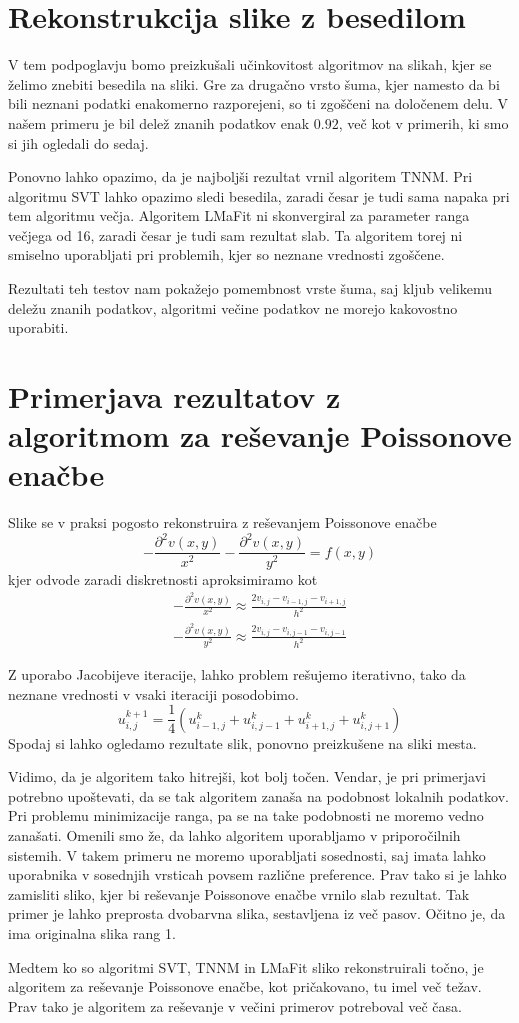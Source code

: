 \section{Rekonstrukcija slike z besedilom}
V tem podpoglavju bomo preizkušali učinkovitost algoritmov na slikah, kjer se želimo znebiti besedila na sliki. Gre za drugačno vrsto šuma, kjer namesto da bi bili neznani podatki enakomerno razporejeni, so ti zgoščeni na določenem delu. V našem primeru je bil delež znanih podatkov enak $0.92$, več kot v primerih, ki smo si jih ogledali do sedaj.


Ponovno lahko opazimo, da je najboljši rezultat vrnil algoritem TNNM. Pri algoritmu SVT lahko opazimo sledi besedila, zaradi česar je tudi sama napaka pri tem algoritmu večja. Algoritem LMaFit ni skonvergiral za parameter ranga večjega od 16, zaradi česar je tudi sam rezultat slab. Ta algoritem torej ni smiselno uporabljati pri problemih, kjer so neznane vrednosti zgoščene.

Rezultati teh testov nam pokažejo pomembnost vrste šuma, saj kljub velikemu deležu znanih podatkov, algoritmi večine podatkov ne morejo kakovostno uporabiti.

\section{Primerjava rezultatov z algoritmom za reševanje Poissonove enačbe}
Slike se v praksi pogosto rekonstruira z reševanjem Poissonove enačbe
\[
    -\frac{\partial^2v(x, y)}{x^2} - \frac{\partial^2v(x, y)}{y^2} = f(x,y)
\]
kjer odvode zaradi diskretnosti aproksimiramo kot 
\begin{align*}
    -\frac{\partial^2v(x, y)}{x^2} \approx \frac{2v_{i,j} - v_{i-1, j} - v_{i+1, j}}{h^2} \\
    -\frac{\partial^2v(x, y)}{y^2} \approx \frac{2v_{i,j} - v_{i, j-1} - v_{i, j-1}}{h^2}
\end{align*}

Z uporabo Jacobijeve iteracije, lahko problem rešujemo iterativno, tako da neznane vrednosti v vsaki iteraciji posodobimo.
\[
  u_{i, j}^{k+1} = \frac{1}{4}(u_{i - 1, j}^k +  u_{i, j - 1}^k + u_{i + 1, j}^k + u_{i, j + 1}^k)
\]
Spodaj si lahko ogledamo rezultate slik, ponovno preizkušene na sliki mesta.

\FloatBarrier

Vidimo, da je algoritem tako hitrejši, kot bolj točen. Vendar, je pri primerjavi potrebno upoštevati, da se tak algoritem zanaša na podobnost lokalnih podatkov. Pri problemu minimizacije ranga, pa se na take podobnosti ne moremo vedno zanašati. Omenili smo že, da lahko algoritem uporabljamo v priporočilnih sistemih. V takem primeru ne moremo uporabljati sosednosti, saj imata lahko uporabnika v sosednjih vrsticah povsem različne preference. Prav tako si je lahko zamisliti sliko, kjer bi reševanje Poissonove enačbe vrnilo slab rezultat. Tak primer je lahko preprosta dvobarvna slika, sestavljena iz več pasov. Očitno je, da ima originalna slika rang 1. 


\FloatBarrier
Medtem ko so algoritmi SVT, TNNM in LMaFit sliko rekonstruirali točno, je algoritem za reševanje Poissonove enačbe, kot pričakovano, tu imel več težav. Prav tako je algoritem za reševanje v večini primerov potreboval več časa.